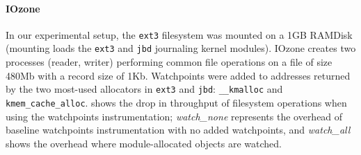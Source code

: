 \documentclass[letterpaper,twocolumn,10pt]{article}
\begin{document}












\paragraph*{IOzone} In our experimental setup, the \texttt{ext3} filesystem was mounted on a 1GB RAMDisk (mounting loads the \texttt{ext3} and \texttt{jbd} journaling kernel modules). IOzone creates two processes (reader, writer) performing common file operations on a file of size 480Mb with a record size of 1Kb. Watchpoints were added to addresses returned by the two most-used allocators in \texttt{ext3} and \texttt{jbd}: \texttt{\_\_kmalloc} and \texttt{kmem\_cache\_alloc}.  shows the drop in throughput of filesystem operations when using the watchpoints instrumentation; \emph{watch\_none} represents the overhead of baseline watchpoints instrumentation with no added watchpoints, and \emph{watch\_all} shows the overhead where module-allocated objects are watched. 
\end{document}
